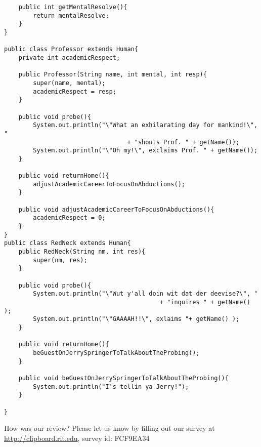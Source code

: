 \documentclass[11pt]{article}
\newenvironment{answer}{\large\lstset{basicstyle=\large}\color{white}}{}
\newenvironment{answer}{\large\lstset{basicstyle=\large}\color{red}}{}
\begin{document}
\begin{enumerate}
\begin{answer}
\begin{lstlisting}
    public int getMentalResolve(){
        return mentalResolve;
    }
}

public class Professor extends Human{
    private int academicRespect;

    public Professor(String name, int mental, int resp){
        super(name, mental);
        academicRespect = resp;
    }

    public void probe(){
        System.out.println("\"What an exhilarating day for mankind!\", "
                                  + "shouts Prof. " + getName());
        System.out.println("\"Oh my!\", exclaims Prof. " + getName());
    }

    public void returnHome(){
        adjustAcademicCareerToFocusOnAbductions();
    }

    public void adjustAcademicCareerToFocusOnAbductions(){
        academicRespect = 0;
    }
}
public class RedNeck extends Human{
    public RedNeck(String nm, int res){
        super(nm, res);
    }

    public void probe(){
        System.out.println("\"Wut y'all doin wit dat der deevise?\", "
                                           + "inquires " + getName() );
        System.out.println("\"GAAAAH!!\", exlaims "+ getName() );
    }

    public void returnHome(){
        beGuestOnJerrySpringerToTalkAboutTheProbing();
    }

    public void beGuestOnJerrySpringerToTalkAboutTheProbing(){
        System.out.println("I's tellin ya Jerry!");
    }

}

\end{lstlisting}
\end{answer}
\end{enumerate}



\vfill
\begin{framed}
How was our review? Please let us know by filling out our survey at\\
\url{http://clipboard.rit.edu}, survey id: FCF9EA34
\end{framed}
\end{document}
